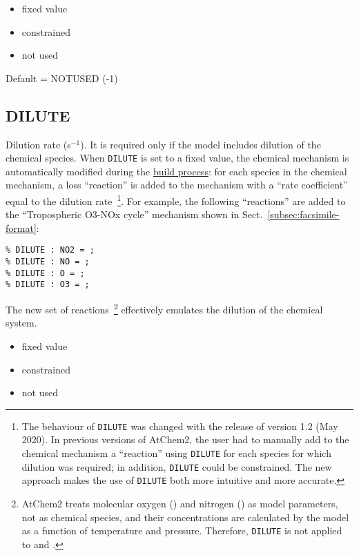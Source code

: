 \begin{itemize}
\item fixed value
\item constrained
\item not used
\end{itemize}

Default = NOTUSED (-1)

\subsection{DILUTE} \label{subsec:dilute}

Dilution rate (s$^{-1}$). It is required only if the model includes
dilution of the chemical species. When \texttt{DILUTE} is set to a
fixed value, the chemical mechanism is automatically modified during
the \hyperref[subsec:build-process]{build process}: for each species
in the chemical mechanism, a loss ``reaction'' is added to the
mechanism with a ``rate coefficient'' equal to the dilution
rate~\footnote{The behaviour of \texttt{DILUTE} was changed with the
  release of version 1.2 (May 2020). In previous versions of AtChem2,
  the user had to manually add to the chemical mechanism a
  ``reaction'' using \texttt{DILUTE} for each species for which
  dilution was required; in addition, \texttt{DILUTE} could be
  constrained. The new approach makes the use of \texttt{DILUTE} both
  more intuitive and more accurate.}. For example, the following
``reactions'' are added to the ``Tropospheric O3-NOx cycle'' mechanism
shown in Sect.~\ref{subsec:facsimile-format}:

\begin{verbatim}
% DILUTE : NO2 = ;
% DILUTE : NO = ;
% DILUTE : O = ;
% DILUTE : O3 = ;
\end{verbatim}

The new set of reactions~\footnote{AtChem2 treats molecular oxygen
  () and nitrogen () as model parameters, not as
  chemical species, and their concentrations are calculated by the
  model as a function of temperature and pressure. Therefore,
  \texttt{DILUTE} is not applied to  and .} effectively
emulates the dilution of the chemical system.

\begin{itemize}
\item fixed value
\item constrained
\item not used
\end{itemize}

